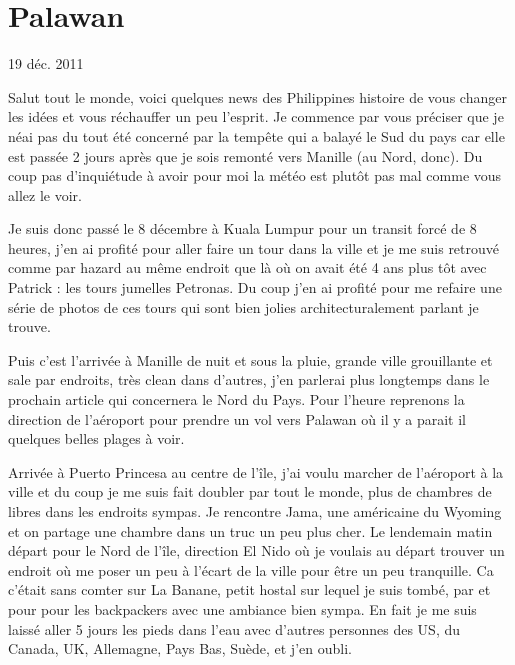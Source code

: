 \section{Palawan}

19 déc. 2011

\begin{multicols}{2}

Salut tout le monde, voici quelques news des Philippines histoire de vous changer les idées et vous réchauffer un peu l'esprit.
Je commence par vous préciser que je néai pas du tout été concerné par la tempête qui a balayé le Sud du pays car elle est passée 2 jours après que je sois remonté vers Manille (au Nord, donc). Du coup pas d'inquiétude à avoir pour moi la météo est plutôt pas mal comme vous allez le voir.

Je suis donc passé le 8 décembre à Kuala Lumpur pour un transit forcé de 8 heures, j'en ai profité pour aller faire un tour dans la ville et je me suis retrouvé comme par hazard au même endroit que là où on avait été 4 ans plus tôt avec Patrick : les tours jumelles Petronas. Du coup j'en ai profité pour me refaire une série de photos de ces tours qui sont bien jolies architecturalement parlant je trouve.


Puis c'est l'arrivée à Manille de nuit et sous la pluie, grande ville grouillante et sale par endroits, très clean dans d'autres, j'en parlerai plus longtemps dans le prochain article qui concernera le Nord du Pays. Pour l'heure reprenons la direction de l'aéroport pour prendre un vol vers Palawan où il y a parait il quelques belles plages à voir.

Arrivée à Puerto Princesa au centre de l'île, j'ai voulu marcher de l'aéroport à la ville et du coup je me suis fait doubler par tout le monde, plus de chambres de libres dans les endroits sympas. Je rencontre Jama, une américaine du Wyoming et on partage une chambre dans un truc un peu plus cher. Le lendemain matin départ pour le Nord de l'île, direction El Nido où je voulais au départ trouver un endroit où me poser un peu à l'écart de la ville pour être un peu tranquille. Ca c'était sans comter sur La Banane, petit hostal sur lequel je suis tombé, par et pour pour les backpackers avec une ambiance bien sympa. En fait je me suis laissé aller 5 jours les pieds dans l'eau avec d'autres personnes des US, du Canada, UK, Allemagne, Pays Bas, Suède, et j'en oubli.


\end{multicols}
